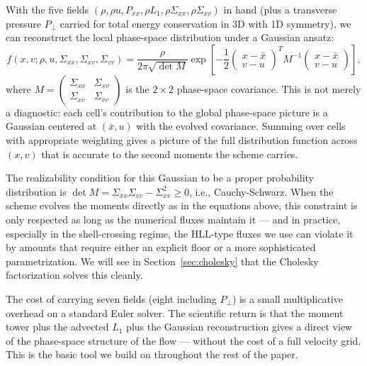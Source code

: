 \documentclass[11pt,letterpaper]{article}
\begin{document}
With the five fields $(\rho, \rho u, P_{xx}, \rho L_1, \rho \Sigma_{xx}, \rho \Sigma_{xv})$ in hand (plus a transverse pressure $P_\perp$ carried for total energy conservation in 3D with 1D symmetry), we can reconstruct the local phase-space distribution under a Gaussian ansatz:
\begin{equation}
f(x, v; \rho, u, \Sigma_{xx}, \Sigma_{xv}, \Sigma_{vv}) = \frac{\rho}{2\pi \sqrt{\det M}} \exp\!\left[-\frac{1}{2} \begin{pmatrix} x - \bar x \\ v - u \end{pmatrix}^T M^{-1} \begin{pmatrix} x - \bar x \\ v - u \end{pmatrix}\right],
\label{eq:gaussian_ansatz}
\end{equation}
where $M = \begin{pmatrix}\Sigma_{xx} & \Sigma_{xv} \\ \Sigma_{xv} & \Sigma_{vv}\end{pmatrix}$ is the $2\times 2$ phase-space covariance. This is not merely a diagnostic: each cell's contribution to the global phase-space picture is a Gaussian centered at $(\bar x, u)$ with the evolved covariance. Summing over cells with appropriate weighting gives a picture of the full distribution function across $(x, v)$ that is accurate to the second moments the scheme carries.

The realizability condition for this Gaussian to be a proper probability distribution is $\det M = \Sigma_{xx}\Sigma_{vv} - \Sigma_{xv}^2 \geq 0$, i.e., Cauchy-Schwarz. When the scheme evolves the moments directly as in the equations above, this constraint is only respected as long as the numerical fluxes maintain it --- and in practice, especially in the shell-crossing regime, the HLL-type fluxes we use can violate it by amounts that require either an explicit floor or a more sophisticated parametrization. We will see in Section~\ref{sec:cholesky} that the Cholesky factorization solves this cleanly.

The cost of carrying seven fields (eight including $P_\perp$) is a small multiplicative overhead on a standard Euler solver. The scientific return is that the moment tower plus the advected $L_1$ plus the Gaussian reconstruction gives a direct view of the phase-space structure of the flow --- without the cost of a full velocity grid. This is the basic tool we build on throughout the rest of the paper.
\end{document}
